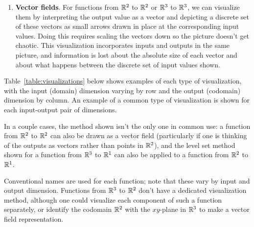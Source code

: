 \documentclass[prettycode,shellescape]{watsonbook}
\begin{document}
\begin{tcolorbox}[title = Function Visualization Methods, colback =
  softblue, colframe = MidnightBlue]
\begin{enumerate}[leftmargin = 12pt, itemsep = 6pt, parsep = 6pt]
    The trace is drawn entirely on the codomain side, which means that
    this visualization lacks information about which $t$ value or
    values mapped to each highlighted point.

  \item \textbf{Vector fields}. For functions from $\mathbb{R}^2$ to $\mathbb{R}^2$ or
    $\mathbb{R}^3$ to $\mathbb{R}^3$, we can visualize them by interpreting the output
    value as a vector and depicting a discrete set of these vectors as small
    arrows drawn in place at the corresponding input values. Doing this
    requires scaling the vectors down so the picture doesn't get
    chaotic. This visualization incorporates inputs and outputs in the
    same picture, and information is lost about the absolute size
    of each vector and about what happens between the discrete set of
    input values shown. 
  \end{enumerate}
\end{tcolorbox}

Table~\ref{table:visualizations} below shows examples of each type of
visualization, with the input (domain) dimension varying by row and
the output (codomain) dimension by column. An example of a common type
of visualization is shown for each input-output pair of dimensions.

In a couple cases, the method shown isn't the only one in common use:
a function from $\mathbb{R}^2$ to $\mathbb{R}^2$ can also be drawn as a vector field
(particularly if one is thinking of the outputs as vectors rather than
points in $\mathbb{R}^2$), and the level set method shown for a function from
$\mathbb{R}^3$ to $\mathbb{R}^1$ can also be applied to a function from $\mathbb{R}^2$ to
$\mathbb{R}^1$.

Conventional names are used for each function; note that these vary by
input and output dimension. Functions from $\mathbb{R}^3$ to $\mathbb{R}^2$ don't have
a dedicated visualization method, although one could visualize each
component of such a function separately, or identify the codomain
$\mathbb{R}^2$ with the $xy$-plane in $\mathbb{R}^3$ to make a vector field
representation.

\end{document}
